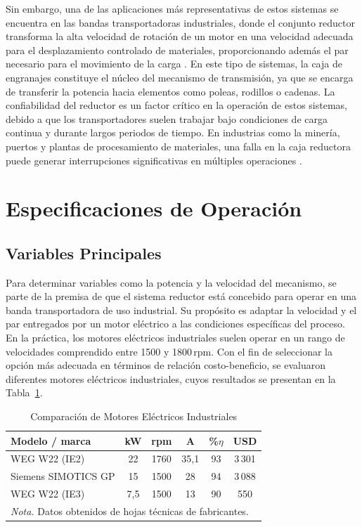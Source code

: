 \documentclass[conference]{IEEEtran}
\begin{document}
Sin embargo, una de las aplicaciones más representativas de estos sistemas se encuentra
en las bandas transportadoras industriales, donde el conjunto reductor transforma la alta
velocidad de rotación de un motor en una velocidad adecuada para el desplazamiento
controlado de materiales, proporcionando además el par necesario para el movimiento de la
carga \cite{conveyor}. En este tipo de sistemas, la caja de engranajes constituye el núcleo
del mecanismo de transmisión, ya que se encarga de transferir la potencia hacia elementos
como poleas, rodillos o cadenas. La confiabilidad del reductor es un factor crítico en la
operación de estos sistemas, debido a que los transportadores suelen trabajar bajo
condiciones de carga continua y durante largos periodos de tiempo. En industrias como la
minería, puertos y plantas de procesamiento de materiales, una falla en la caja reductora
puede generar interrupciones significativas en múltiples operaciones \cite{guomao2026}.

\section{Especificaciones de Operación}

\subsection{Variables Principales}

Para determinar variables como la potencia y la velocidad del mecanismo, se parte de la
premisa de que el sistema reductor está concebido para operar en una banda transportadora
de uso industrial. Su propósito es adaptar la velocidad y el par entregados por un motor
eléctrico a las condiciones específicas del proceso. En la práctica, los motores eléctricos
industriales suelen operar en un rango de velocidades comprendido entre 1500 y 1800\,rpm.
Con el fin de seleccionar la opción más adecuada en términos de relación costo-beneficio,
se evaluaron diferentes motores eléctricos industriales, cuyos resultados se presentan en
la Tabla~\ref{tab:comparacion-motores}.

\begin{table}[H]
\centering
\caption{Comparación de Motores Eléctricos Industriales}
\label{tab:comparacion-motores}
\begin{tabular}{lccccc}
\hline
\textbf{Modelo / marca} & \textbf{kW} & \textbf{rpm} & \textbf{A} &
\textbf{\%$\eta$} & \textbf{USD} \\
\hline
WEG W22 (IE2)        & 22    & 1760 & 35{,}1 & 93 & 3\,301 \\
Siemens SIMOTICS GP  & 15    & 1500 & 28     & 94 & 3\,088 \\
WEG W22 (IE3)        & 7{,}5 & 1500 & 13     & 90 & 550    \\
\hline
\multicolumn{6}{l}{\small\textit{Nota.} Datos obtenidos de hojas técnicas de fabricantes.}
\end{tabular}
\end{table}
\end{document}
